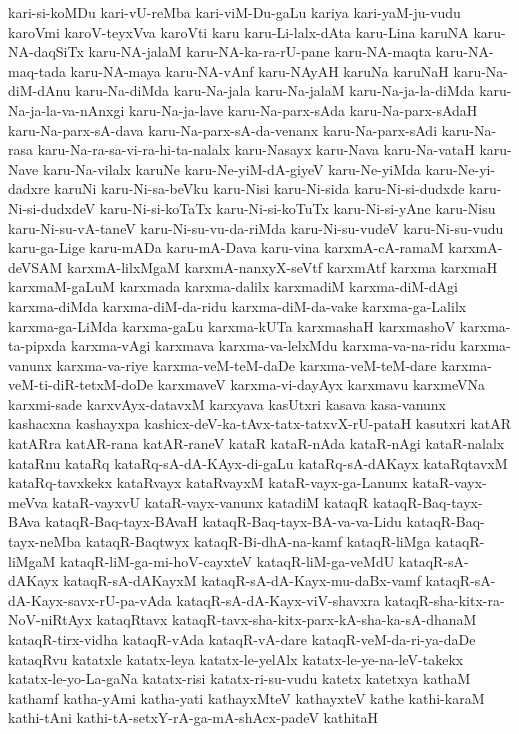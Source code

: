 {kari-si-koMDu
kari-vU-reMba
kari-viM-Du-gaLu
kariya
kari-yaM-ju-vudu
karoVmi
karoV-teyxVva
karoVti
karu
karu-Li-lalx-dAta
karu-Lina
karuNA
karu-NA-daqSiTx
karu-NA-jalaM
karu-NA-ka-ra-rU-pane
karu-NA-maqta
karu-NA-maq-tada
karu-NA-maya
karu-NA-vAnf
karu-NAyAH
karuNa
karuNaH
karu-Na-diM-dAnu
karu-Na-diMda
karu-Na-jala
karu-Na-jalaM
karu-Na-ja-la-diMda
karu-Na-ja-la-va-nAnxgi
karu-Na-ja-lave
karu-Na-parx-sAda
karu-Na-parx-sAdaH
karu-Na-parx-sA-dava
karu-Na-parx-sA-da-venanx
karu-Na-parx-sAdi
karu-Na-rasa
karu-Na-ra-sa-vi-ra-hi-ta-nalalx
karu-Nasayx
karu-Nava
karu-Na-vataH
karu-Nave
karu-Na-vilalx
karuNe
karu-Ne-yiM-dA-giyeV
karu-Ne-yiMda
karu-Ne-yi-dadxre
karuNi
karu-Ni-sa-beVku
karu-Nisi
karu-Ni-sida
karu-Ni-si-dudxde
karu-Ni-si-dudxdeV
karu-Ni-si-koTaTx
karu-Ni-si-koTuTx
karu-Ni-si-yAne
karu-Nisu
karu-Ni-su-vA-taneV
karu-Ni-su-vu-da-riMda
karu-Ni-su-vudeV
karu-Ni-su-vudu
karu-ga-Lige
karu-mADa
karu-mA-Dava
karu-vina
karxmA-cA-ramaM
karxmA-deVSAM
karxmA-lilxMgaM
karxmA-nanxyX-seVtf
karxmAtf
karxma
karxmaH
karxmaM-gaLuM
karxmada
karxma-dalilx
karxmadiM
karxma-diM-dAgi
karxma-diMda
karxma-diM-da-ridu
karxma-diM-da-vake
karxma-ga-Lalilx
karxma-ga-LiMda
karxma-gaLu
karxma-kUTa
karxmashaH
karxmashoV
karxma-ta-pipxda
karxma-vAgi
karxmava
karxma-va-lelxMdu
karxma-va-na-ridu
karxma-vanunx
karxma-va-riye
karxma-veM-teM-daDe
karxma-veM-teM-dare
karxma-veM-ti-diR-tetxM-doDe
karxmaveV
karxma-vi-dayAyx
karxmavu
karxmeVNa
karxmi-sade
karxvAyx-datavxM
karxyava
kasUtxri
kasava
kasa-vanunx
kashacxna
kashayxpa
kashicx-deV-ka-tAvx-tatx-tatxvX-rU-pataH
kasutxri
katAR
katARra
katAR-rana
katAR-raneV
kataR
kataR-nAda
kataR-nAgi
kataR-nalalx
kataRnu
kataRq
kataRq-sA-dA-KAyx-di-gaLu
kataRq-sA-dAKayx
kataRqtavxM
kataRq-tavxkekx
kataRvayx
kataRvayxM
kataR-vayx-ga-Lanunx
kataR-vayx-meVva
kataR-vayxvU
kataR-vayx-vanunx
katadiM
kataqR
kataqR-Baq-tayx-BAva
kataqR-Baq-tayx-BAvaH
kataqR-Baq-tayx-BA-va-va-Lidu
kataqR-Baq-tayx-neMba
kataqR-Baqtwyx
kataqR-Bi-dhA-na-kamf
kataqR-liMga
kataqR-liMgaM
kataqR-liM-ga-mi-hoV-cayxteV
kataqR-liM-ga-veMdU
kataqR-sA-dAKayx
kataqR-sA-dAKayxM
kataqR-sA-dA-Kayx-mu-daBx-vamf
kataqR-sA-dA-Kayx-savx-rU-pa-vAda
kataqR-sA-dA-Kayx-viV-shavxra
kataqR-sha-kitx-ra-NoV-niRtAyx
kataqRtavx
kataqR-tavx-sha-kitx-parx-kA-sha-ka-sA-dhanaM
kataqR-tirx-vidha
kataqR-vAda
kataqR-vA-dare
kataqR-veM-da-ri-ya-daDe
kataqRvu
katatxle
katatx-leya
katatx-le-yelAlx
katatx-le-ye-na-leV-takekx
katatx-le-yo-La-gaNa
katatx-risi
katatx-ri-su-vudu
katetx
katetxya
kathaM
kathamf
katha-yAmi
katha-yati
kathayxMteV
kathayxteV
kathe
kathi-karaM
kathi-tAni
kathi-tA-setxY-rA-ga-mA-shAcx-padeV
kathitaH
}
